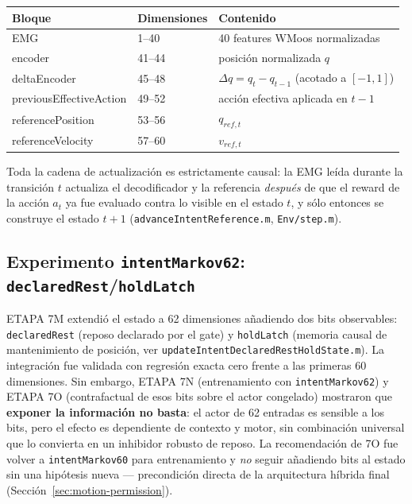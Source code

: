 \documentclass[11pt,a4paper]{article}
\begin{document}
\begin{center}
\begin{tabular}{lll}
\toprule
Bloque & Dimensiones & Contenido \\
\midrule
EMG & 1--40 & 40 features WMoos normalizadas \\
encoder & 41--44 & posición normalizada $q$ \\
deltaEncoder & 45--48 & $\Delta q = q_t - q_{t-1}$ (acotado a $[-1,1]$) \\
previousEffectiveAction & 49--52 & acción efectiva aplicada en $t-1$ \\
referencePosition & 53--56 & $q_{ref,t}$ \\
referenceVelocity & 57--60 & $v_{ref,t}$ \\
\bottomrule
\end{tabular}
\end{center}

Toda la cadena de actualización es estrictamente causal: la EMG leída durante la
transición $t$ actualiza el decodificador y la referencia \emph{después} de que el
reward de la acción $a_t$ ya fue evaluado contra lo visible en el estado $t$, y sólo
entonces se construye el estado $t+1$ (\texttt{advanceIntentReference.m},
\texttt{Env/step.m}).

\subsection{Experimento \texttt{intentMarkov62}: \texttt{declaredRest}/\texttt{holdLatch}}

ETAPA 7M extendió el estado a 62 dimensiones añadiendo dos bits observables:
\texttt{declaredRest} (reposo declarado por el gate) y \texttt{holdLatch} (memoria
causal de mantenimiento de posición, ver \texttt{updateIntentDeclaredRestHoldState.m}).
La integración fue validada con regresión exacta cero frente a las primeras 60
dimensiones. Sin embargo, ETAPA 7N (entrenamiento con \texttt{intentMarkov62}) y
ETAPA 7O (contrafactual de esos bits sobre el actor congelado) mostraron que
\textbf{exponer la información no basta}: el actor de 62 entradas es sensible a los
bits, pero el efecto es dependiente de contexto y motor, sin combinación universal que
lo convierta en un inhibidor robusto de reposo. La recomendación de 7O fue volver a
\texttt{intentMarkov60} para entrenamiento y \emph{no} seguir añadiendo bits al estado
sin una hipótesis nueva --- precondición directa de la arquitectura híbrida final
(Sección~\ref{sec:motion-permission}).
\end{document}
